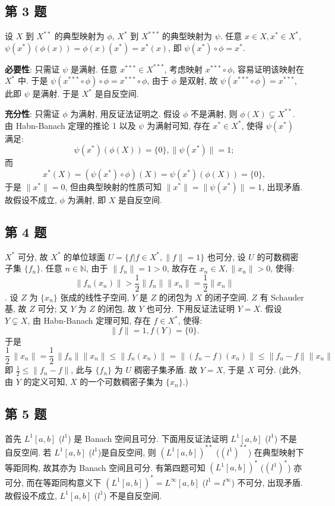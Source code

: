 \documentclass[\ROOT/main.tex]{subfiles}
\begin{document}
\subsection{第 3 题}
设 $X$ 到 $X^{**}$ 的典型映射为 $\phi$, $X^*$ 到 $X^{***}$ 的典型映射为 $\psi$.
任意 $x \in X, x^* \in X^*$, $\psi (x^*) (\phi (x)) = \phi (x) (x^*) = x^* (x)$,
即 $\psi (x^*) \circ \phi = x^*$.

\noindent \textbf{必要性}:
只需证 $\psi$ 是满射.
任意 $x^{***} \in X^{***}$, 考虑映射 $x^{***} \circ \phi $, 容易证明该映射在 $X^*$ 中.
于是 $\psi (x^{***} \circ \phi) \circ \phi = x^{***} \circ \phi$, 由于 $\phi$ 是双射,
故 $\psi (x^{***} \circ \phi) = x^{***}$, 此即 $\psi$ 是满射.
于是 $X^*$ 是自反空间.

\noindent \textbf{充分性}:
只需证 $\phi$ 为满射, 用反证法证明之.
假设 $\phi$ 不是满射, 则 $\phi (X) \subsetneq X^{**}$.
由 Habn-Banach 定理的推论 1 以及 $\psi$ 为满射可知, 存在 $x^* \in X^*$, 使得 $\psi (x^*)$ 满足:
\[
    \psi (x^*) (\phi (X)) = \{ 0 \} , \| \psi (x^*) \| = 1;
\]
而
\[
    x^* (X) = (\psi (x^*) \circ \phi)(X) = \psi (x^*) (\phi (X)) = \{ 0 \},
\]
于是 $\| x^* \| = 0$, 但由典型映射的性质可知 $\| x^* \| = \| \psi (x^*) \| = 1$, 出现矛盾.
故假设不成立, $\phi$ 为满射, 即 $X$ 是自反空间.

\subsection{第 4 题}
$X^*$ 可分, 故 $X^*$ 的单位球面 $U = \{ f | f \in X^*, \| f \| = 1\}$ 也可分, 设 $U$ 的可数稠密子集 $\{ f_n \}$.
任意 $n \in \mathbb{N}$, 由于 $\| f_n \| = 1 > 0$, 故存在 $x_n \in X, \| x_n \| > 0$, 使得:
\[
    \| f_n (x_n) \| > \frac{1}{2} \| f_n \| \| x_n \| = \frac{1}{2} \| x_n \|
\].
设 $Z$ 为 $\{ x_n \}$ 张成的线性子空间, $Y$ 是 $Z$ 的闭包为 $X$ 的闭子空间.
$Z$ 有 Schauder 基, 故 $Z$ 可分; 又 $Y$ 为 $Z$ 的闭包, 故 $Y$ 也可分.
下用反证法证明 $Y = X$. 
假设 $Y \subsetneq X$, 由 Habn-Banach 定理可知, 存在 $f \in X^*$, 使得:
\[
    \| f \| = 1, f(Y) = \{ 0 \}.
\]
于是
\[
    \frac{1}{2} \, \| x_n \| = \frac{1}{2} \, \| f_n \| \| x_n \| \leqslant \| f_n (x_n) \| = \| (f_n - f) (x_n) \| \leqslant \| f_n - f \| \| x_n \|
\]
即 $\frac{1}{2} \leqslant \| f_n - f \|$, 此与 $\{ f_n \}$ 为 $U$ 稠密子集矛盾. 故 $Y = X$, 于是 $X$ 可分.
(此外, 由 $Y$ 的定义可知, $X$ 的一个可数稠密子集为 $\{ x_n \}$.)

\subsection{第 5 题}
首先 $L^1 [a, b]$ ($l^1$) 是 Banach 空间且可分.
下面用反证法证明 $L^1 [a, b]$ ($l^1$) 不是自反空间.
若 $L^1 [a, b]$ ($l^1$)是自反空间,
则 $(L^1 [a, b])^{**}$ ($(l^1)^{**}$) 在典型映射下等距同构,
故其亦为 Banach 空间且可分.
有第四题可知 $(L^1 [a, b])^{*}$ ($(l^1)^{*}$) 亦可分,
而在等距同构意义下 $(L^1 [a, b])^{*} = L^{\infty} [a, b]$ ($l^1 = l^{\infty}$) 不可分, 出现矛盾.
故假设不成立, $L^1 [a, b]$ ($l^1$) 不是自反空间.
\end{document}
